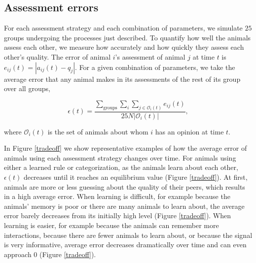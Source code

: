\subsection{Assessment errors }
For each assessment strategy and each combination of parameters, we simulate $25$ groups undergoing the processes just described.  To quantify how well the animals assess each other, we measure how accurately and how quickly they assess each other's quality. The error of animal $i$'s assessment of animal $j$ at time $t$ is $e_{ij}(t)=|a_{ij}(t)-q_j|$. For a given combination of parameters, we take the average error that any animal makes in its assessments of the rest of its group over all groups, 
\begin{linenomath*}
\begin{equation*}
\epsilon(t) = \frac{\sum_{\text{groups}}\sum_i\sum_{j\in \mathscr{O}_i(t)}e_{ij}(t)}{25N|\mathscr{O}_i(t)|},
\end{equation*}
\end{linenomath*}
where $\mathscr{O}_i(t)$ is the set of animals about whom $i$ has an opinion at time $t$.

In Figure \ref{tradeoff} we show representative examples of how the average error of animals using each assessment strategy changes over time.  For animals using either a learned rule or categorization, as the animals learn about each other, $\epsilon(t)$ decreases until it reaches an equilibrium value (Figure \ref{tradeoff}). At first, animals are more or less guessing about the quality of their peers, which results in a high average error. When learning is difficult, for example because the animals' memory is poor or there are many animals to learn about, the average error barely decreases from its initially high level (Figure \ref{tradeoff}). When learning is easier, for example because the animals can remember more interactions, because there are fewer animals to learn about, or because the signal is very informative, average error decreases dramatically over time and can even approach $0$ (Figure \ref{tradeoff}).  

